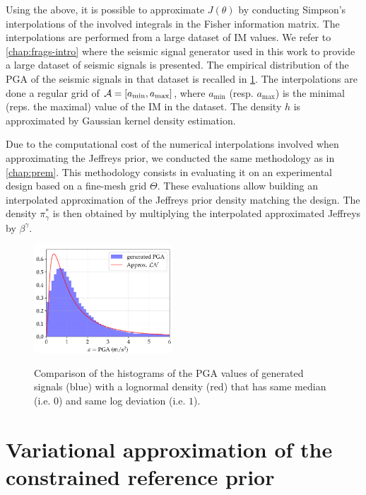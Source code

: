 Using the above, it is possible to approximate $J(\theta)$ by conducting Simpson's interpolations of the involved integrals in the Fisher information matrix. The interpolations are performed from a large dataset of IM values. We refer to   \cref{chap:frags-intro} where the seismic signal generator used in this work to provide
a large dataset of seismic signals is presented. The empirical distribution of the PGA of the seismic signals in that dataset is recalled in \cref{fig:constr-frags:PGA}. %
The interpolations are done a regular grid of $\mathcal{A}=[a_{\min},a_{\max}]$, where $a_{\min}$ (resp. $a_{\max}$) is the minimal (reps. the maximal) value of the IM in the dataset.
The density $h$ is approximated by Gaussian kernel density estimation. 

Due to the computational cost of the numerical interpolations involved when approximating the Jeffreys prior, we conducted the same methodology as in   \cref{chap:prem}. This methodology consists in evaluating it on an experimental design based on a fine-mesh grid $\Theta$. These evaluations allow building an interpolated approximation of the Jeffreys prior density matching the design.
The density $\pi^\ast_\gamma$ is then obtained by multiplying the interpolated approximated Jeffreys by $\beta^\gamma$.

\begin{figure}[h]
    \centering
    \includegraphics[width=5.2cm]{figures/constr-frags/pgadistrib.pdf}
    \label{fig:constr-frags:PGA}
    \caption{%
    Comparison of the histograms of the PGA values of generated signals (blue) with a lognormal
    density (red) that has same median (i.e. $0$) and same log deviation (i.e. $1$).}
\end{figure}





\section{Variational approximation of the constrained reference prior}\label{sec:constr-frags:varp}


